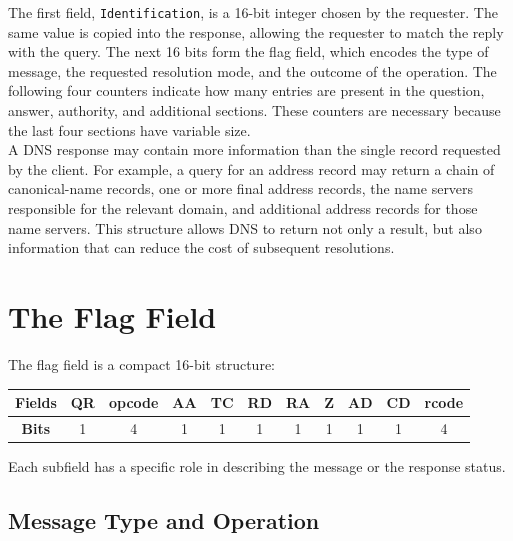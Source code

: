 \documentclass{scrbook}
\begin{document}
	The first field, \texttt{Identification}, is a 16-bit integer chosen by the requester. The same value is copied into the response, allowing the requester to match the reply with the query. The next 16 bits form the flag field, which encodes the type of message, the requested resolution mode, and the outcome of the operation. The following four counters indicate how many entries are present in the question, answer, authority, and additional sections. These counters are necessary because the last four sections have variable size.\\
	
	A DNS response may contain more information than the single record requested by the client. For example, a query for an address record may return a chain of canonical-name records, one or more final address records, the name servers responsible for the relevant domain, and additional address records for those name servers. This structure allows DNS to return not only a result, but also information that can reduce the cost of subsequent resolutions.
	
	\section{The Flag Field}
	
	The flag field is a compact 16-bit structure:
	\begin{center}
		\begin{tabular}{|c|c|c|c|c|c|c|c|c|c|c|}
			\hline
			
			\textbf{Fields} & QR & opcode & AA & TC & RD & RA & Z & AD & CD & rcode \\ \hline
			
			\textbf{Bits} & 1 & 4 & 1 & 1 & 1 & 1 & 1 & 1 & 1 & 4 \\ \hline
		\end{tabular}
	\end{center}
	
	Each subfield has a specific role in describing the message or the response status.
	
	\subsection{Message Type and Operation}
	
\end{document}
